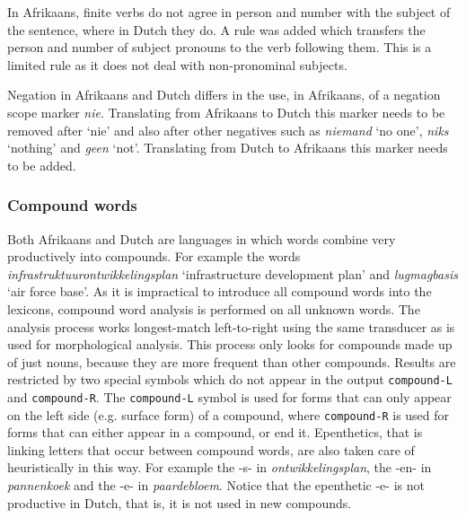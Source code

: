 \documentclass[11pt]{article}
\begin{document}
In Afrikaans, finite verbs do not agree in person and number with the subject of the sentence, where in 
Dutch they do. A rule was added which transfers the person and number of subject pronouns to the verb
following them. This is a limited rule as it does not deal with non-pronominal subjects.

Negation in Afrikaans and Dutch differs in the use, in Afrikaans, of a negation scope 
marker {\em nie}. Translating from Afrikaans to Dutch this marker needs to be removed after `nie' and
also after other negatives such as {\em niemand} `no one', {\em niks} `nothing' and {\em geen} `not'. Translating from 
Dutch to Afrikaans this marker needs to be added.

\subsubsection{Compound words}


Both Afrikaans and Dutch are languages in which words combine very
productively into compounds. For example the words {\em infrastruktuurontwikkelingsplan}
`infrastructure development plan' and {\em lugmagbasis}
`air force base'. As it is impractical to introduce
all compound words into the lexicons, compound word analysis is performed on
all unknown words. The analysis process works longest-match left-to-right
using the same transducer as is used for morphological analysis. This process only
looks for compounds made up of just nouns, because they are more frequent than other compounds.
Results are restricted by two special
symbols which do not appear in the output {\small {\tt compound-L}} and {\small {\tt compound-R}}.
The {\small {\tt compound-L}} symbol is used for forms that can only appear on the
left side (e.g. surface form) of a compound, where {\small {\tt compound-R}} is
used for forms that can either appear in a compound, or end it.
Epenthetics, that is linking letters that occur between compound words,
are also taken care of heuristically in this way. For example the -s-
in \emph{ontwikkelingsplan}, the -en- in \emph{pannenkoek} and the -e- in \emph{paardebloem}.
Notice that the epenthetic -e- is not productive in Dutch, that is, it is not used 
in new compounds.

%
%
%
\end{document}

